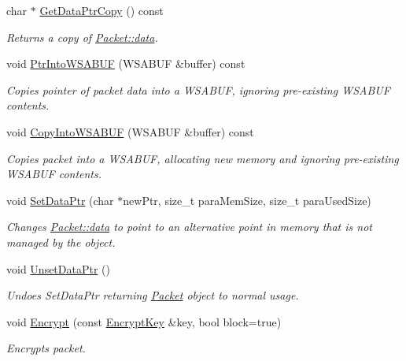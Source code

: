 \begin{DoxyCompactItemize}
char $\ast$ \hyperlink{class_packet_ae86889cb0cd14f16837424268c07d72d}{GetDataPtrCopy} () const 
\begin{DoxyCompactList}\small\item\em Returns a copy of \hyperlink{class_packet_a6ce50b69127890b9012cb91f287f137f}{Packet::data}. \item\end{DoxyCompactList}\item 
void \hyperlink{class_packet_aa035f4665c27f8960ae6a585fb3a9ab6}{PtrIntoWSABUF} (WSABUF \&buffer) const 
\begin{DoxyCompactList}\small\item\em Copies pointer of packet data into a WSABUF, ignoring pre-\/existing WSABUF contents. \item\end{DoxyCompactList}\item 
void \hyperlink{class_packet_acd150eca1bc37b444f37598c7181d808}{CopyIntoWSABUF} (WSABUF \&buffer) const 
\begin{DoxyCompactList}\small\item\em Copies packet into a WSABUF, allocating new memory and ignoring pre-\/existing WSABUF contents. \item\end{DoxyCompactList}\item 
void \hyperlink{class_packet_a38192749e78469e015c2234fa5f3fed9}{SetDataPtr} (char $\ast$newPtr, size\_\-t paraMemSize, size\_\-t paraUsedSize)
\begin{DoxyCompactList}\small\item\em Changes \hyperlink{class_packet_a6ce50b69127890b9012cb91f287f137f}{Packet::data} to point to an alternative point in memory that is not managed by the object. \item\end{DoxyCompactList}\item 
void \hyperlink{class_packet_aec0d1088b95c8a2daa6a12affc28b2d9}{UnsetDataPtr} ()
\begin{DoxyCompactList}\small\item\em Undoes SetDataPtr returning \hyperlink{class_packet}{Packet} object to normal usage. \item\end{DoxyCompactList}\item 
void \hyperlink{class_packet_a7960ab336730d43e2358b8fd2876a074}{Encrypt} (const \hyperlink{class_encrypt_key}{EncryptKey} \&key, bool block=true)
\begin{DoxyCompactList}\small\item\em Encrypts packet. \item\end{DoxyCompactList}\item 

\end{DoxyCompactItemize}
